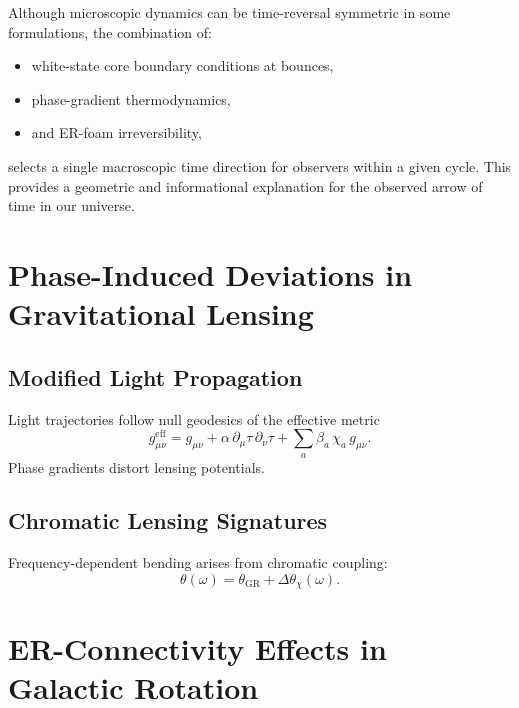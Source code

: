 Although microscopic dynamics can be time-reversal symmetric in some formulations, the combination of:
\begin{itemize}
  \item white-state core boundary conditions at bounces,
  \item phase-gradient thermodynamics,
  \item and ER-foam irreversibility,
\end{itemize}
selects a single macroscopic time direction for observers within a given cycle.
This provides a geometric and informational explanation for the observed arrow of time in our universe.


\chapter{Phase-Induced Deviations in Gravitational Lensing}

\section{Modified Light Propagation}
Light trajectories follow null geodesics of the effective metric
\[
g_{\mu\nu}^{\mathrm{eff}} = g_{\mu\nu} + \alpha\,\partial_\mu\tau\,\partial_\nu\tau 
+ \sum_a \beta_a\,\chi_a\,g_{\mu\nu}.
\]
Phase gradients distort lensing potentials.

\section{Chromatic Lensing Signatures}
Frequency-dependent bending arises from chromatic coupling:
\[
\theta(\omega)=\theta_{\mathrm{GR}}+\Delta\theta_{\chi}(\omega).
\]


\chapter{ER-Connectivity Effects in Galactic Rotation}

